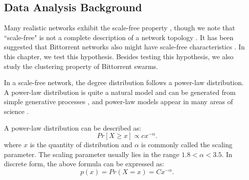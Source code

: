 \subsection{Data Analysis Background}
Many realistic networks exhibit the scale-free property \cite{clauset2009power}, though we note that ``scale-free" is not a complete description of a network topology \cite{doyle2005robust}\cite{mahadevan2006systematic}. 
It has been suggested that Bittorrent networks also might have scale-free characteristics \cite{dale2008evolution}. 
In this chapter, we test this hypothesis. 
Besides testing this hypothesis, we also study the clustering property of Bittorrent swarms. 

In a scale-free network, the degree distribution follows a power-law distribution.   
A power-law distribution is quite a natural model and can be generated from simple generative processes \cite{mitzenmacher2004brief}, and power-law models appear in many areas of science \cite{clauset2009power} \cite{mitzenmacher2004brief}. 

A power-law distribution can be described as:
\begin{equation}
Pr[X\ge x] \propto cx^{-\alpha}.
\label{eq:powerlaw}
\end{equation}
where $x$ is the quantity of distribution and $\alpha$ is commonly called the scaling parameter. 
The scaling parameter usually lies in the range $1.8<\alpha<3.5$.
In discrete form, the above formula can be expressed as:
\begin{equation}
p(x) = Pr(X=x) = Cx^{- \alpha}.
\label{eq:powerlawdiscrete}
\end{equation}


